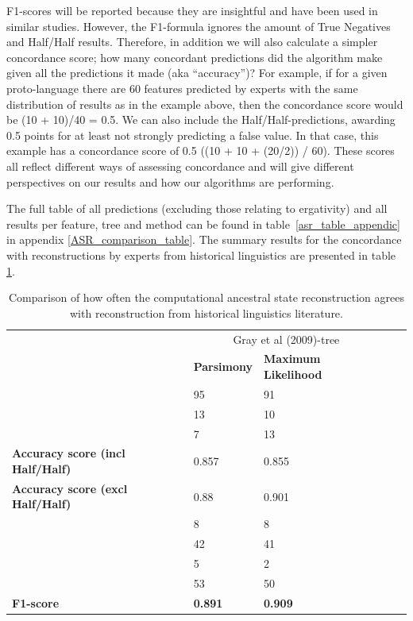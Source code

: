 \documentclass[draft,10pt]{article} %
\begin{document}
F1-scores will be reported because they are insightful and have been used in similar studies. However, the F1-formula ignores the amount of True Negatives and Half/Half results. Therefore, in addition we will also calculate a simpler concordance score; how many concordant predictions did the algorithm make given all the predictions it made (aka ``accuracy'')? For example, if for a given proto-language there are 60 features predicted by experts with the same distribution of results as in the example above, then the concordance score would be (10 + 10)/40 = 0.5. We can also include the Half/Half-predictions, awarding 0.5 points for at least not strongly predicting a false value. In that case, this example has a concordance score of 0.5 ((10 + 10 + (20/2)) / 60). These scores all reflect different ways of assessing concordance and will give different perspectives on our results and how our algorithms are performing. %

The full table of all predictions (excluding those relating to ergativity) and all results per feature, tree and method can be found in table~\ref{asr_table_appendic} in appendix \ref{ASR_comparison_table}. The summary results for the concordance with reconstructions by experts from historical linguistics are presented in table \ref{reconstruction_summary_table}. 
 
\begin{table}[H]
\centering
\caption{Comparison of how often the computational ancestral state reconstruction agrees with reconstruction from historical linguistics literature.}
\label{reconstruction_summary_table}
\begin{tabular}{|p{5cm}| p{2cm}|  p{2cm}| p{2cm} | p{2cm} |}
\hline
& \multicolumn{2}{c|}{Gray et al (2009)-tree}\\ \cline{2-3}
& \textbf{Parsimony} & \textbf{Maximum Likelihood} \\ \hline

 \cellcolor{hedvig_lightgreen!50}{Agree} & 95 & 91 \\ \hline
\cellcolor{hedvig_red!50}{Disagree} &13&10\\ \hline
 \cellcolor{hedvig_yellow!50}{Half / Half} &7&13\\ \hline

 \textbf{Accuracy score (incl Half/Half)} &0.857& 0.855 \\ \hline
 \textbf{Accuracy score (excl Half/Half)} &0.88&0.901\\ \hline
\cellcolor{hedvig_red!50}{False Negatives} &8 &8  \\ \hline
 \cellcolor{hedvig_lightgreen!50}{True Negatives} &42 &41\\ \hline
\cellcolor{hedvig_red!50}{False Positives} &5&2\\ \hline
 \cellcolor{hedvig_lightgreen!50}{True Positives} &53&50\\ \hline
\textbf{F1-score} & \textbf{0.891} & \textbf{0.909} \\ \hline


\end{tabular}
\end{table}
\end{document}
